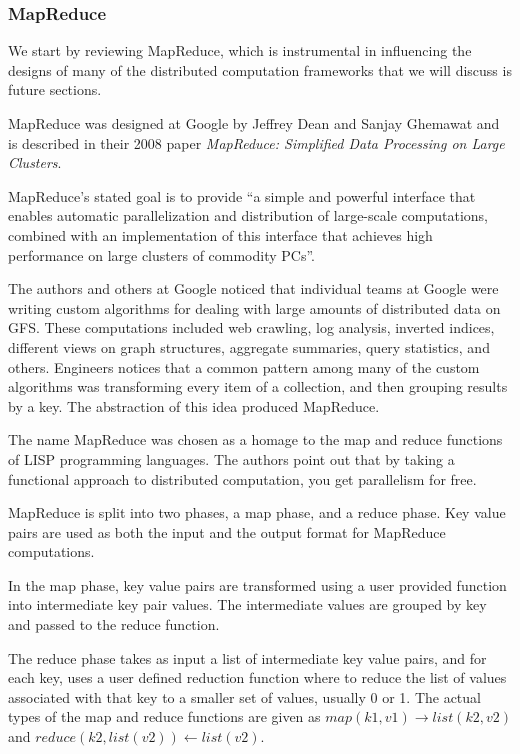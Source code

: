 \documentclass[]{article}
\begin{document}
\subsubsection{MapReduce}\label{sssec:mapreduce}
We start by reviewing MapReduce, which is instrumental in influencing the designs of many of the distributed computation frameworks that we will discuss is future sections. 

MapReduce was designed at Google by Jeffrey Dean and Sanjay Ghemawat and is described in their 2008 paper \textit{MapReduce: Simplified Data Processing on Large Clusters}\cite{dean2008mapreduce}.

MapReduce's stated goal is to provide ``a simple and powerful interface that enables automatic parallelization and distribution of large-scale computations, combined with an implementation of this interface that achieves high performance on large clusters of commodity PCs''. 

The authors and others at Google noticed that individual teams at Google were writing custom algorithms for dealing with large amounts of distributed data on GFS. These computations included web crawling, log analysis, inverted indices, different views on graph structures, aggregate summaries, query statistics, and others. Engineers notices that a common pattern among many of the custom algorithms was transforming every item of a collection, and then grouping results by a key. The abstraction of this idea produced MapReduce. 

The name MapReduce was chosen as a homage to the map and reduce functions of LISP programming languages. The authors point out that by taking a functional approach to distributed computation, you get parallelism for free.

MapReduce is split into two phases, a map phase, and a reduce phase. Key value pairs are used as both the input and the output format for MapReduce computations. 

In the map phase, key value pairs are transformed using a user provided function into intermediate key pair values. The intermediate values are grouped by key and passed to the reduce function.

The reduce phase takes as input a list of intermediate key value pairs, and for each key, uses a user defined reduction function where to reduce the list of values associated with that key to a smaller set of values, usually 0 or 1. The actual types of the map and reduce functions are given as $map(k1, v1)\longrightarrow list(k2,v2)$ and $reduce(k2, list(v2))\longleftarrow list(v2)$.
\end{document}
